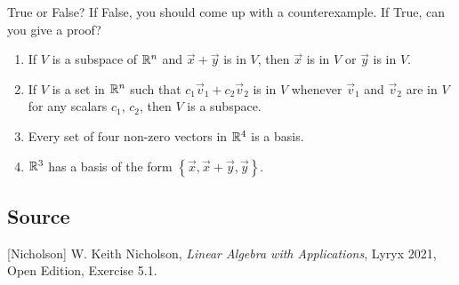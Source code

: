\documentclass{ximera}
\author{}
\begin{document}
\begin{exercise}

True or False?  If False, you should come up with a counterexample.  If True, can you give a proof?

 \begin{enumerate}
     \item If $V$ is a subspace of $\mathbb{R}^n$ and $\vec{x}+\vec{y}$ is in $V$, then $\vec{x}$ is in $V$ or $\vec{y}$ is in $V$.

 \begin{multipleChoice}
 \end{multipleChoice}

\item If $V$ is a set in $\mathbb{R}^n$ such that $c_1{\vec{v}_1}+c_2{\vec{v}_2}$ is in $V$ whenever ${\vec{v}_1}$ and ${\vec{v}_2}$ are in $V$ for any scalars $c_1$, $c_2$, then $V$ is a subspace.

 \begin{multipleChoice}
 \end{multipleChoice}

 \item Every set of four non-zero vectors in $\mathbb{R}^4$ is a basis.

 \begin{multipleChoice}
 \end{multipleChoice}

 \item $\mathbb{R}^3$ has a basis of the form $\left\{\vec{x},\vec{x}+\vec{y},\vec{y}\right\}$.

 \begin{multipleChoice}
 \end{multipleChoice}
 \end{enumerate}

 
\end{exercise}

\subsection*{Source}
[Nicholson] W. Keith Nicholson, {\it Linear Algebra with Applications}, Lyryx 2021, Open Edition, Exercise 5.1.
\end{document}
